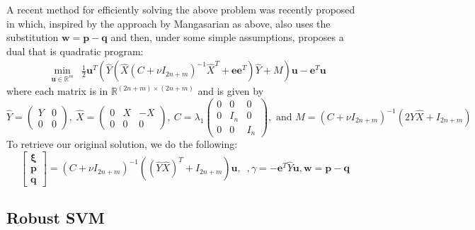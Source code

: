 \documentclass[11pt]{article}
\newcommand{\ds}{\displaystyle}
\begin{document}
A recent method for efficiently solving the above problem was recently proposed in \cite{pqsvm} which, inspired by the approach by Mangasarian as above, also uses the substitution $\bm{w} = \bm{p} - \bm{q}$ and then, under some simple assumptions, proposes a dual that is quadratic program:
\begin{eqnarray*}
& \ds\min_{\bm{u}\in\mathbb{R}^m} & \frac{1}{2}\bm{u}^T\left( \hat{Y}\left(\hat{X}\left(C + \nu I_{2n+m}\right)^{-1}\hat{X}^T + \bm{e}\bm{e}^T\right)\hat{Y} + M\right)\bm{u} - \bm{e}^T\bm{u}
\end{eqnarray*}
where each matrix is in $\mathbb{R}^{(2n+m)\times(2n+m)}$ and is given by
\[
\hat{Y} = \begin{pmatrix} Y & 0 \\ 0 & 0 \end{pmatrix}, \ \hat{X} = \begin{pmatrix} 0 & X & -X \\ 0 & 0 & 0 \end{pmatrix}, \ C = \lambda_1\begin{pmatrix} 0 & 0 & 0 \\ 0 & I_n & 0 \\ 0 & 0 & I_n \end{pmatrix}, \mbox{ and } M = (C+\nu I_{2n+m})^{-1}(2\hat{Y}\hat{X}+I_{2n+m})
\]
To retrieve our original solution, we do the following:
\[
\begin{bmatrix} \bm{\xi} \\ \bm{p} \\ \bm{q} \end{bmatrix} = (C + \nu I_{2n+m})^{-1}((\hat{Y}\hat{X})^T + I_{2n+m})\bm{u}, \enspace, \gamma = -\bm{e}^T\hat{Y}\bm{u}, \bm{w} = \bm{p} - \bm{q}
\]

\subsection{Robust SVM \cite{rsvm}}
\end{document}
